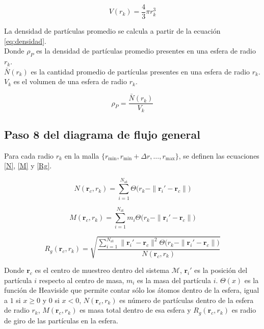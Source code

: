 	 
	 \begin{equation}
	 	V(r_k) = \frac{4}{3} \pi r_{k}^{3}
	 	\label{volumen}
	 \end{equation}
	 
	 La densidad de part\'{i}culas promedio se calcula a partir de la ecuaci\'{o}n \ref{eq:densidad}. \\
	 Donde \(\rho_{P}\) es la densidad de part\'{i}culas promedio presentes en una esfera de radio \(r_k\).\\
	 \(\bar N(r_{k})\) es la cantidad promedio de part\'{i}culas presentes en una esfera de radio \(r_k\).
	 \(V_{k}\) es el volumen de una esfera de radio \(r_{k}\).
	 
	 \begin{equation}
	 	\rho_P = \frac{\bar N(r_{k})}{V_{k}}
	 	\label{eq:densidad}
	 \end{equation}
	 

	\subsection{Paso 8 del diagrama de flujo general}

	Para cada radio $r_k$ en la malla $\{r_{\text{min}}, r_{\text{min}} + \Delta r, \ldots, r_{\text{max}}\}$, se definen las ecuaciones \ref{N}, \ref{M} y \ref{Rg}.
	
	\begin{equation}
		N(\mathbf{r}_c, r_k) = \sum_{i=1}^{N_{\text{at}}} 
		\Theta\!\bigl(r_k - \|\mathbf{r}_i' - \mathbf{r}_c\|\bigr)
		\label{N}
	\end{equation}
	
	\begin{equation}
		M(\mathbf{r}_c, r_k) = \sum_{i=1}^{N_{\text{at}}} 
		m_i \Theta\!\bigl(r_k - \|\mathbf{r}_i' - \mathbf{r}_c\|\bigr)
		\label{M}
	\end{equation}
	
	\begin{equation}
		R_g(\mathbf{r}_c, r_k) = 
		\sqrt{\frac{\displaystyle\sum_{i=1}^{N_{\text{at}}} 
				\|\mathbf{r}_i' - \mathbf{r}_c\|^2  
				\Theta\!\bigl(r_k - \|\mathbf{r}_i' - \mathbf{r}_c\|\bigr)}
			{N(\mathbf{r}_c, r_k)}}
		\label{Rg}
	\end{equation}
	
	Donde $\mathbf{r}_c$ es el centro de muestreo dentro del sistema $\mathcal{M}$,
	$\mathbf{r}_i'$ es la posici\'{o}n del part\'{i}cula $i$ respecto al centro de masa, 
	$m_i$ es la masa del part\'{i}cula $i$. $\Theta(x)$ es la funci\'{o}n de Heaviside que permite contar s\'{o}lo los \'{a}tomos dentro de la esfera, igual a $1$ si $x \ge 0$ y $0$ si $x < 0$, $N(\mathbf{r}_c, r_k)$ es n\'{u}mero de part\'{i}culas dentro de la esfera de radio $r_k$, $M(\mathbf{r}_c, r_k)$ es masa total dentro de esa esfera y 
	$R_g(\mathbf{r}_c, r_k)$ es radio de giro de las part\'{i}culas en la esfera.
	

